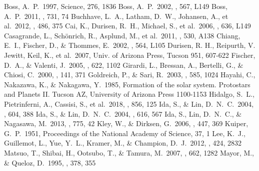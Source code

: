 \documentclass[twocolumn, dvipdfmx]{aastex62}
\begin{document}
\begin{CJK*}{UTF8}{min}
\vspace{5mm}


\begin{thebibliography}{}

 Boss, A.~P.\ 1997, Science, 276, 1836
 Boss, A.~P.\ 2002, \apjl, 567, L149
 Boss, A.~P.\ 2011, \apj, 731, 74
 Buchhave, L.~A., Latham, D.~W., Johansen, A., et al.\ 2012, \nat, 486, 375
 Cai, K., Durisen, R.~H., Michael, S., et al.\ 2006, \apjl, 636, L149
 Casagrande, L., Sch{\"o}nrich, R., Asplund, M., et al.\ 2011, \aap, 530, A138
 Chiang, E.~I., Fischer, D., \& Thommes, E.\ 2002, \apjl, 564, L105
 Durisen, R. H., Reipurth, V. Jewitt, Keil, K., et al.\ 2007, Univ. of Arizona Press, Tucson 951, 607-622
 Fischer, D.~A., \& Valenti, J.\ 2005, \apj, 622, 1102
 Girardi, L., Bressan, A., Bertelli, G., \& Chiosi, C.\ 2000, \aaps, 141, 371
 Goldreich, P., \& Sari, R.\ 2003, \apj, 585, 1024
 Hayahi, C., Nakazawa, K., \& Nakagawa, Y.\ 1985, Formation of the solar system. Protostars and Planets II. Tucson AZ, University of Arizona Press 1100-1153
 Hidalgo, S.~L., Pietrinferni, A., Cassisi, S., et al.\ 2018, \apj, 856, 125
 Ida, S., \& Lin, D.~N.~C.\ 2004, \apj, 604, 388
 Ida, S., \& Lin, D.~N.~C.\ 2004, \apj, 616, 567
 Ida, S., Lin, D.~N.~C., \& Nagasawa, M.\ 2013, \apj, 775, 42
 Kley, W., \& Dirksen, G.\ 2006, \aap, 447, 369
 Kuiper, G.~P.\ 1951, Proceedings of the National Academy of Science, 37, 1
 Lee, K.~J., Guillemot, L., Yue, Y.~L., Kramer, M., \& Champion, D.~J.\ 2012, \mnras, 424, 2832
 Matsuo, T., Shibai, H., Ootsubo, T., \& Tamura, M.\ 2007, \apj, 662, 1282
 Mayor, M., \& Queloz, D.\ 1995, \nat, 378, 355

\end{thebibliography}
\end{CJK*}
\end{document}
